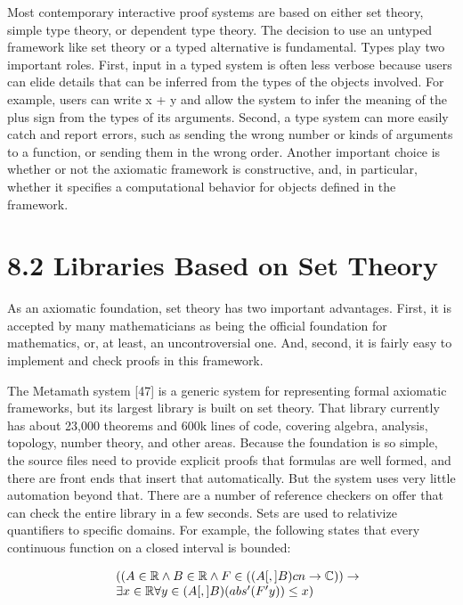 \documentclass[
]{article}
\begin{document}
Most contemporary interactive proof systems are based on either set
theory, simple type theory, or dependent type theory. The decision to
use an untyped framework like set theory or a typed alternative is
fundamental. Types play two important roles. First, input in a typed
system is often less verbose because users can elide details that can be
inferred from the types of the objects involved. For example, users can
write x + y and allow the system to infer the meaning of the plus sign
from the types of its arguments. Second, a type system can more easily
catch and report errors, such as sending the wrong number or kinds of
arguments to a function, or sending them in the wrong order. Another
important choice is whether or not the axiomatic framework is
constructive, and, in particular, whether it specifies a computational
behavior for objects defined in the framework.

\section{8.2 Libraries Based on Set
Theory}\label{libraries-based-on-set-theory}

As an axiomatic foundation, set theory has two important advantages.
First, it is accepted by many mathematicians as being the official
foundation for mathematics, or, at least, an uncontroversial one. And,
second, it is fairly easy to implement and check proofs in this
framework.

The Metamath system {[}47{]} is a generic system for representing formal
axiomatic frameworks, but its largest library is built on set theory.
That library currently has about 23,000 theorems and 600k lines of code,
covering algebra, analysis, topology, number theory, and other areas.
Because the foundation is so simple, the source files need to provide
explicit proofs that formulas are well formed, and there are front ends
that insert that automatically. But the system uses very little
automation beyond that. There are a number of reference checkers on
offer that can check the entire library in a few seconds. Sets are used
to relativize quantifiers to specific domains. For example, the
following states that every continuous function on a closed interval is
bounded:

\[
\begin{array}{r l}&((A \in \mathbb {R} \land B \in \mathbb {R} \land F \in ((A [, ] B) c n \rightarrow \mathbb {C})) \rightarrow\\&\exists x \in \mathbb {R} \forall y \in (A [, ] B) (a b s ^ {\prime} (F ^ {\prime} y)) \leq x)\end{array}
\]
\end{document}
